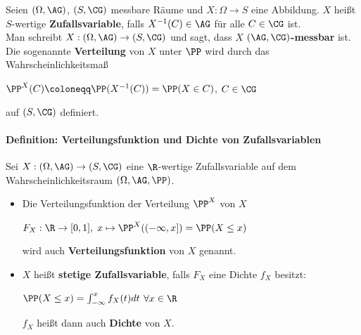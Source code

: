 Seien $(\Omega,\AG)$, $(S,\CG)$ messbare Räume und $X:\Omega\rightarrow S$ eine Abbildung.
$X$ heißt $S$-wertige \textbf{Zufallsvariable}, falls $X^{-1}(C)\in\AG$ für alle $C\in\CG$ ist.\\
Man schreibt $X:(\Omega,\AG)\rightarrow(S,\CG)$ und sagt, dass $X$ $(\AG,\CG)$\textbf{-messbar} ist.
Die sogenannte \textbf{Verteilung} von $X$ unter $\PP$ wird durch das Wahrscheinlichkeitsmaß
\begin{tightcenter}
	$\PP^X(C)\coloneqq\PP(X^{-1}(C))=\PP(X\in C)$, \qquad$C\in\CG$
\end{tightcenter}
auf $(S,\CG)$ definiert.

\newpage
\paragraph{Definition: Verteilungsfunktion und Dichte von Zufallsvariablen}
Sei $X:(\Omega,\AG)\rightarrow(S,\CG)$ eine $\R$-wertige Zufallsvariable auf dem Wahrscheinlichkeitsraum $(\Omega,\AG,\PP)$.
\begin{itemize}
	\item Die Verteilungsfunktion der Verteilung $\PP^X$ von $X$
	\begin{tightcenter}
		$F_X:\R\rightarrow[0,1],\; x\mapsto\PP^X((-\infty,x])=\PP(X\leq x)$
	\end{tightcenter}
	wird auch \textbf{Verteilungsfunktion} von $X$ genannt.
	\item $X$ heißt \textbf{stetige Zufallsvariable}, falls $F_X$ eine Dichte $f_X$ besitzt:
	\begin{tightcenter}
		$\PP(X\leq x)=\int_{-\infty}^{x}f_X(t)dt$ \qquad$\forall x\in\R$
	\end{tightcenter}
	$f_X$ heißt dann auch \textbf{Dichte} von $X$.
\end{itemize}